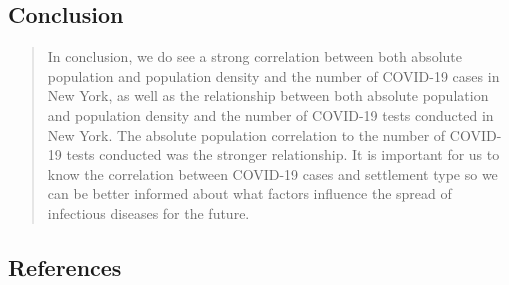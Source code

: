 \documentclass[
  12pt,
]{article}
\begin{document}
\hypertarget{conclusion}{%
\subsection{Conclusion}\label{conclusion}}

\begin{quote}
In conclusion, we do see a strong correlation between both absolute
population and population density and the number of COVID-19 cases in
New York, as well as the relationship between both absolute population
and population density and the number of COVID-19 tests conducted in New
York. The absolute population correlation to the number of COVID-19
tests conducted was the stronger relationship. It is important for us to
know the correlation between COVID-19 cases and settlement type so we
can be better informed about what factors influence the spread of
infectious diseases for the future.
\end{quote}

\newpage

\hypertarget{references}{%
\subsection{References}\label{references}}
\end{document}
